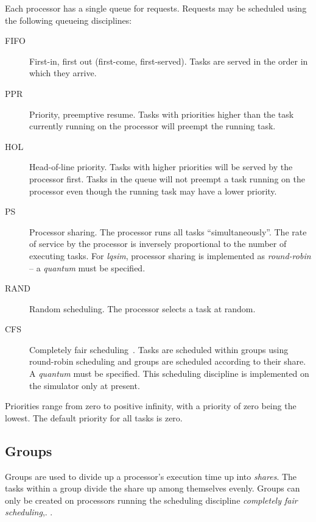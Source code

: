 Each processor has a single queue for requests.  Requests may be
scheduled using the following queueing disciplines:
\begin{description}
\item[FIFO] First-in, first out (first-come,
  first-served).  Tasks are served in the order in which they arrive.
\item[PPR] Priority, preemptive
  resume.  Tasks with
  priorities
  higher than the task currently running on the processor will preempt
  the running task.
\item[HOL] Head-of-line priority.  Tasks
  with higher priorities will be served by the processor first.  Tasks
  in the queue will not preempt a task running on the processor even
  though the running task may have a lower priority.
\item[PS] Processor sharing.  The processor
  runs all tasks ``simultaneously''.  The rate of service by the
  processor is inversely proportional to the number of executing
  tasks.  For \emph{lqsim}, processor
  sharing is implemented as
  \emph{round-robin}
  -- a \emph{quantum} must be specified.
\item[RAND] Random scheduling.  The processor selects a task at random. 
\item[CFS] Completely fair scheduling~\cite{perf:li-2009-mascots-fairshare}.  Tasks are scheduled within groups using
  round-robin scheduling and groups are scheduled according to their share.  A
  \emph{quantum} must be specified.  This scheduling discipline is implemented on the
  simulator only at present.
\end{description}

Priorities range from zero to positive
infinity, with a priority of zero being the lowest.  The default
priority for all tasks is zero.

\subsection{Groups}
\label{sec:groups}

Groups\cite{perf:li-2009-mascots-fairshare} are used to divide up a processor's
execution time up into \emph{shares}.  The tasks within a group divide the share up among
themselves evenly.  Groups can only be created on processors running the scheduling discipline
\emph{completely fair scheduling},.  .

